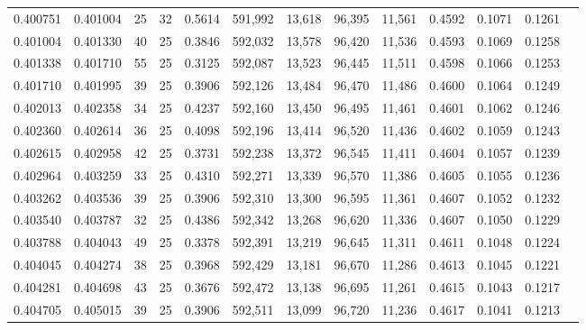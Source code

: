 \begin{tabular}{rrrrrrrrrrrrr}
0.400751 & 0.401004 &    25 &  32 &                                     0.5614 & 591,992 &  13,618 &  96,395 &  11,561 & 0.4592 & 0.1071 & 0.1261 \\
0.401004 & 0.401330 &    40 &  25 &                                     0.3846 & 592,032 &  13,578 &  96,420 &  11,536 & 0.4593 & 0.1069 & 0.1258 \\
0.401338 & 0.401710 &    55 &  25 &                                     0.3125 & 592,087 &  13,523 &  96,445 &  11,511 & 0.4598 & 0.1066 & 0.1253 \\
0.401710 & 0.401995 &    39 &  25 &                                     0.3906 & 592,126 &  13,484 &  96,470 &  11,486 & 0.4600 & 0.1064 & 0.1249 \\
0.402013 & 0.402358 &    34 &  25 &                                     0.4237 & 592,160 &  13,450 &  96,495 &  11,461 & 0.4601 & 0.1062 & 0.1246 \\
0.402360 & 0.402614 &    36 &  25 &                                     0.4098 & 592,196 &  13,414 &  96,520 &  11,436 & 0.4602 & 0.1059 & 0.1243 \\
0.402615 & 0.402958 &    42 &  25 &                                     0.3731 & 592,238 &  13,372 &  96,545 &  11,411 & 0.4604 & 0.1057 & 0.1239 \\
0.402964 & 0.403259 &    33 &  25 &                                     0.4310 & 592,271 &  13,339 &  96,570 &  11,386 & 0.4605 & 0.1055 & 0.1236 \\
0.403262 & 0.403536 &    39 &  25 &                                     0.3906 & 592,310 &  13,300 &  96,595 &  11,361 & 0.4607 & 0.1052 & 0.1232 \\
0.403540 & 0.403787 &    32 &  25 &                                     0.4386 & 592,342 &  13,268 &  96,620 &  11,336 & 0.4607 & 0.1050 & 0.1229 \\
0.403788 & 0.404043 &    49 &  25 &                                     0.3378 & 592,391 &  13,219 &  96,645 &  11,311 & 0.4611 & 0.1048 & 0.1224 \\
0.404045 & 0.404274 &    38 &  25 &                                     0.3968 & 592,429 &  13,181 &  96,670 &  11,286 & 0.4613 & 0.1045 & 0.1221 \\
0.404281 & 0.404698 &    43 &  25 &                                     0.3676 & 592,472 &  13,138 &  96,695 &  11,261 & 0.4615 & 0.1043 & 0.1217 \\
0.404705 & 0.405015 &    39 &  25 &                                     0.3906 & 592,511 &  13,099 &  96,720 &  11,236 & 0.4617 & 0.1041 & 0.1213 \\

\end{tabular}
